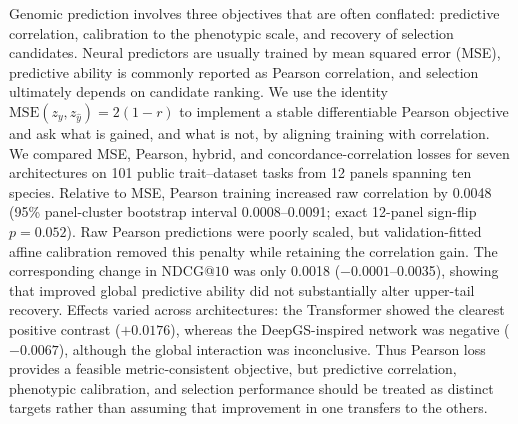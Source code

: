 Genomic prediction involves three objectives that are often conflated:
predictive correlation, calibration to the phenotypic scale, and recovery of
selection candidates. Neural predictors are usually trained by mean squared
error (MSE), predictive ability is commonly reported as Pearson correlation, and
selection ultimately depends on candidate ranking. We use the identity
$\mathrm{MSE}(z_y,z_{\hat y})=2(1-r)$ to implement a stable differentiable
Pearson objective and ask what is gained, and what is not, by aligning training
with correlation. We compared MSE, Pearson, hybrid, and concordance-correlation
losses for seven architectures on 101 public trait--dataset tasks from 12 panels
spanning ten species. Relative to MSE, Pearson training increased raw
correlation by 0.0048 (95\% panel-cluster bootstrap interval 0.0008--0.0091;
exact 12-panel sign-flip $p=0.052$). Raw Pearson predictions were poorly scaled,
but validation-fitted affine calibration removed this penalty while retaining
the correlation gain. The corresponding change in NDCG@$10$ was only 0.0018
($-0.0001$--0.0035), showing that improved global predictive ability did not
substantially alter upper-tail recovery. Effects varied across architectures:
the Transformer showed the clearest positive contrast ($+0.0176$), whereas the
DeepGS-inspired network was negative ($-0.0067$), although the global
interaction was inconclusive. Thus Pearson loss provides a feasible
metric-consistent objective, but predictive correlation, phenotypic calibration,
and selection performance should be treated as distinct targets rather than
assuming that improvement in one transfers to the others.
